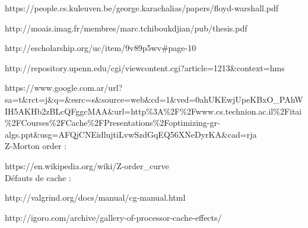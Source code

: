 \documentclass[a4paper,11pt]{article}
\begin{document}
https://people.cs.kuleuven.be/george.karachalias/papers/floyd-warshall.pdf

http://moais.imag.fr/membres/marc.tchiboukdjian/pub/thesis.pdf

http://escholarship.org/uc/item/9v89p5wv\#page-10

http://repository.upenn.edu/cgi/viewcontent.cgi?article=1213\&context=hms

https://www.google.com.ar/url?sa=t\&rct=j\&q=\&esrc=s\&source=web\&cd=1\&ved=0ahUKEwjUpeKBxO\_PAhWIH5AKHb2zBLcQFggcMAA\&url=http\%3A\%2F\%2Fwww.cs.technion.ac.il\%2Fitai\%2FCourses\%2FCache\%2FPresentations\%2Foptimizing-gr-algs.ppt\&usg=AFQjCNEidlujtiLvwSzdGqEQ56XNeDyrKA\&cad=rja\\


\noindent Z-Morton order :

https://en.wikipedia.org/wiki/Z-order\_curve\\


\noindent Défauts de cache :

http://valgrind.org/docs/manual/cg-manual.html

http://igoro.com/archive/gallery-of-processor-cache-effects/
\end{document}

